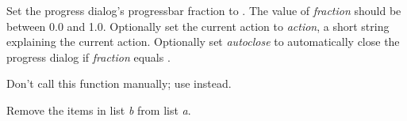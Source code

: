 \documentclass[letterpaper,10pt,english]{sphinxmanual}
\begin{document}

\begin{fulllineitems}
\label{setlyze/std:setlyze.std.on_update_progress_dialog}
Set the progress dialog's progressbar fraction to .
The value of \emph{fraction} should be between 0.0 and 1.0. Optionally set
the current action to \emph{action}, a short string explaining the current
action. Optionally set \emph{autoclose} to automatically close the
progress dialog if \emph{fraction} equals .

Don't call this function manually; use {\hyperref[setlyze/std:setlyze.std.update_progress_dialog]{}}
instead.

\end{fulllineitems}


\begin{fulllineitems}
\label{setlyze/std:setlyze.std.remove_items_from_list}
Remove the items in list \emph{b} from list \emph{a}.

\end{fulllineitems}

\end{document}
